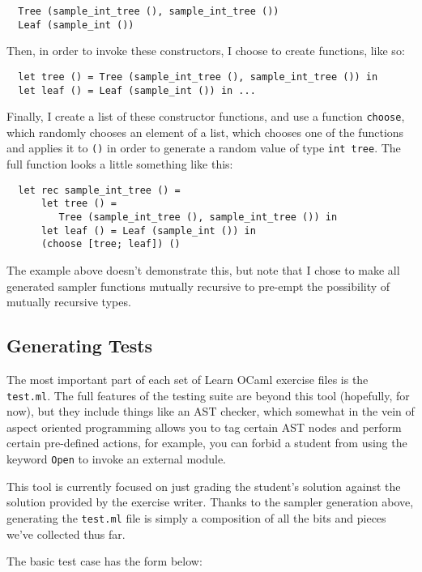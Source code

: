\documentclass[11pt]{article} %
\begin{document}
\begin{lstlisting}
  Tree (sample_int_tree (), sample_int_tree ())
  Leaf (sample_int ())
\end{lstlisting}

Then, in order to invoke these constructors, I choose to create functions, like so:

\begin{lstlisting}
  let tree () = Tree (sample_int_tree (), sample_int_tree ()) in
  let leaf () = Leaf (sample_int ()) in ...
\end{lstlisting}

Finally, I create a list of these constructor functions, and use a function \verb+choose+, which randomly chooses an element of a list, which chooses one of the functions and applies it to \verb+()+ in order to generate a random value of type \verb+int tree+. The full function looks a little something like this:

\begin{lstlisting}
  let rec sample_int_tree () =
      let tree () =
         Tree (sample_int_tree (), sample_int_tree ()) in
      let leaf () = Leaf (sample_int ()) in
      (choose [tree; leaf]) ()
\end{lstlisting}

The example above doesn't demonstrate this, but note that I chose to make all generated sampler functions mutually recursive to pre-empt the possibility of mutually recursive types.

\subsection{Generating Tests}
The most important part of each set of Learn OCaml exercise files is the \verb+test.ml+. The full features of the testing suite are beyond this tool (hopefully, for now), but they include things like an AST checker, which somewhat in the vein of aspect oriented programming allows you to tag certain AST nodes and perform certain pre-defined actions, for example, you can forbid a student from using the keyword \verb+Open+ to invoke an external module.

This tool is currently focused on just grading the student's solution against the solution provided by the exercise writer. Thanks to the sampler generation above, generating the \verb+test.ml+ file is simply a composition of all the bits and pieces we've collected thus far.

The basic test case has the form below:
\end{document}
